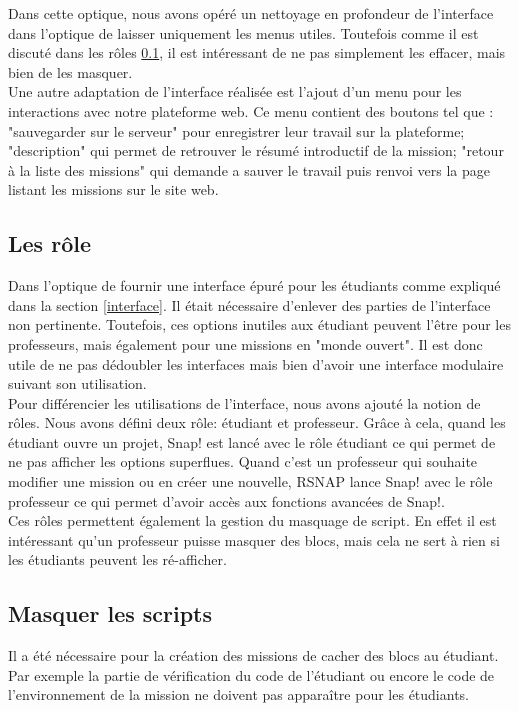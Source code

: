Dans cette optique, nous avons opéré un nettoyage en profondeur de l'interface dans l'optique de laisser uniquement les menus utiles. Toutefois comme il est discuté dans les rôles \ref{role}, il est intéressant de ne pas simplement les effacer, mais bien de les masquer.\\

Une autre adaptation de l'interface réalisée est l'ajout d'un menu pour les interactions avec notre plateforme web. Ce menu contient des boutons tel que : "sauvegarder sur le serveur" pour enregistrer leur travail sur la plateforme; "description" qui permet de retrouver le résumé introductif de la mission; "retour à la liste des missions" qui demande a sauver le travail puis renvoi vers la page listant les missions sur le site web.

\subsection{Les rôle}
\label{role}
Dans l'optique de fournir une interface épuré pour les étudiants comme expliqué dans la section \ref{interface}. Il était nécessaire d'enlever des parties de l'interface non pertinente. Toutefois, ces options inutiles aux étudiant peuvent l'être pour les professeurs, mais également pour une missions en "monde ouvert". Il est donc utile de ne pas dédoubler les interfaces mais bien d'avoir une interface modulaire suivant son utilisation. \\

Pour différencier les utilisations de l'interface, nous avons ajouté la notion de rôles. Nous avons défini deux rôle: étudiant et professeur. Grâce à cela, quand les étudiant ouvre un projet, Snap! est lancé avec le rôle étudiant ce qui permet de ne pas afficher les options superflues. Quand c'est un professeur qui souhaite modifier une mission ou en créer une nouvelle, RSNAP lance Snap! avec le rôle professeur ce qui permet d'avoir accès aux fonctions avancées de Snap!.\\

Ces rôles permettent également la gestion du masquage de script. En effet il est intéressant qu'un professeur puisse masquer des blocs, mais cela ne sert à rien si les étudiants peuvent les ré-afficher.

\subsection{Masquer les scripts}
Il a été nécessaire pour la création des missions de cacher des blocs au étudiant. Par exemple la partie de vérification du code de l'étudiant ou encore le code de l'environnement de la mission ne doivent pas apparaître pour les étudiants. 

